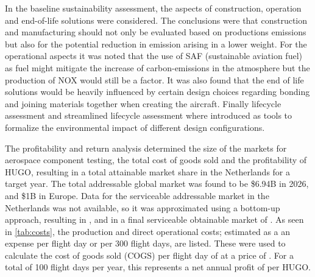 In the baseline sustainability assessment, the aspects of construction, operation and end-of-life solutions were considered. The conclusions were that construction and manufacturing should not only be evaluated based on productions emissions but also for the potential reduction in emission arising in a lower weight. For the operational aspects it was noted that the use of SAF (sustainable aviation fuel) as fuel might mitigate the increase of carbon-emissions in the atmosphere but the production of NOX would still be a factor. It was also found that the end of life solutions would be heavily influenced by certain design choices regarding bonding and joining materials together when creating the aircraft. Finally lifecycle assessment and streamlined lifecycle assessment where introduced as tools to formalize the environmental impact of different design configurations.  




The profitability and return analysis determined the size of the markets for aerospace component testing, the total cost of goods sold and the profitability of HUGO, resulting in a total attainable market share in the Netherlands for a target year. The total addressable global market was found to be \$6.94B in 2026, and \$1B in Europe. Data for the serviceable addressable market in the Netherlands was not available, so it was approximated using a bottom-up approach, resulting in , and in a final serviceable obtainable market of . As seen in \autoref{tab:costs}, the production and direct operational costs; estimated as a an expense per flight day or per 300 flight days, are listed. These were used to calculate the cost of goods sold (COGS) per flight day of  at a price of . For a total of 100 flight days per year, this represents a net annual profit of  per HUGO. 


